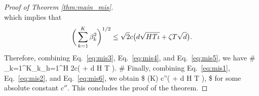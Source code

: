 \begin{proof}[Proof of Theorem \ref{thm:main_mis}]
\begin{equation*}
 \end{equation*}
 which implies that 
 \begin{equation}
 \label{eq:mis5}
 \bigg( \sum_{k=1}^K \beta_k^2 \biggr )^{1/2} \leq \sqrt{2} c\bigl ( d \sqrt{H T \iota} + \zeta  T \sqrt{d} \bigr).
 \end{equation}
 Therefore, combining Eq.~\eqref{eq:mis3}, Eq.~\eqref{eq:mis4}, and Eq.~\eqref{eq:mis5}, we have 
 \#\label{eq:mis6}
 \sum_{k=1}^{K}\beta_k\sum_{h=1}^H 
   \le 2c\cdot (  + \zeta d  H T\sqrt{\logt} ).
 \#
  Finally, combining Eq.~\eqref{eq:mis1}, Eq.~\eqref{eq:mis2}, and  Eq.~\eqref{eq:mis6}, we obtain 
  \$
  (K)  \le c''\cdot (  + \zeta d  H T\sqrt{\logt} ),
  \$
 for some absolute constant $c''$. This concludes the proof of the theorem.
 \end{proof}

